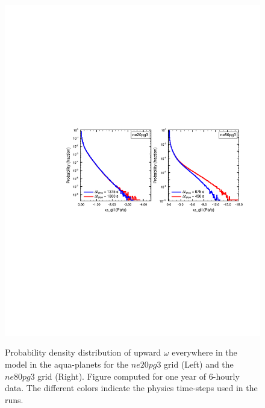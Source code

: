 \documentclass{agujournal}
\begin{document}
\begin{figure}[t]
\begin{center}
\noindent\includegraphics[width=30pc,angle=0]{figs/panel_pdf_dtphys}\\
\end{center}
\caption{Probability density distribution of upward $\omega$ everywhere in the model in the aqua-planets for the $ne20pg3$ grid (Left) and the $ne80pg3$ grid (Right). Figure computed for one year of 6-hourly data. The different colors indicate the physics time-steps used in the runs.}
\label{fig:pdf-dtphys}
\end{figure}
\end{document}
